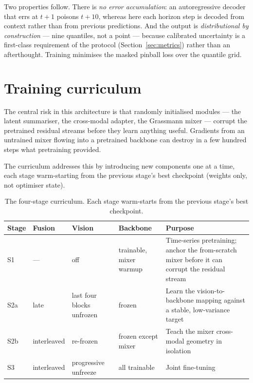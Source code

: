 Two properties follow. There is \emph{no error accumulation}: an autoregressive decoder that
errs at $t+1$ poisons $t+10$, whereas here each horizon step is decoded from context rather
than from previous predictions. And the output is \emph{distributional by construction} ---
nine quantiles, not a point --- because calibrated uncertainty is a first-class requirement
of the protocol (Section~\ref{sec:metrics}) rather than an afterthought. Training minimises
the masked pinball loss over the quantile grid.

\section{Training curriculum}
\label{sec:curriculum}

The central risk in this architecture is that randomly initialised modules --- the latent
summariser, the cross-modal adapter, the Grassmann mixer --- corrupt the pretrained residual
streams before they learn anything useful. Gradients from an untrained mixer flowing into a
pretrained backbone can destroy in a few hundred steps what pretraining provided.

The curriculum addresses this by introducing new components one at a time, each stage
warm-starting from the previous stage's best checkpoint (weights only, not optimiser state).

\begin{table}[h!]
\centering
\small
\begin{tabular}{l l l l p{4.6cm}}
\hline
\textbf{Stage} & \textbf{Fusion} & \textbf{Vision} & \textbf{Backbone} & \textbf{Purpose} \\
\hline
S1 & --- & off & trainable, mixer warmup & Time-series pretraining; anchor the
from-scratch mixer before it can corrupt the residual stream \\
S2a & late & last four blocks unfrozen & frozen & Learn the vision-to-backbone mapping
against a stable, low-variance target \\
S2b & interleaved & re-frozen & frozen except mixer & Teach the mixer cross-modal geometry
in isolation \\
S3 & interleaved & progressive unfreeze & all trainable & Joint fine-tuning \\
\hline
\end{tabular}
\caption{The four-stage curriculum. Each stage warm-starts from the previous stage's best
checkpoint.}
\label{tab:curriculum}
\end{table}

